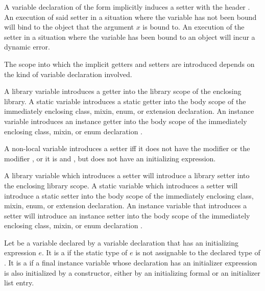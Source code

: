\documentclass[makeidx]{article}
\begin{document}
\LMHash{}%
A variable declaration of the form
implicitly induces a setter with the header
.
An execution of said setter
in a situation where the variable \id{} has not been bound
will bind \id{} to the object that the argument $x$ is bound to.
An execution of the setter
in a situation where the variable \id{} has been bound to an object
will incur a dynamic error.
\EndCase

\LMHash{}%
The scope into which the implicit getters and setters are introduced
depends on the kind of variable declaration involved.

\LMHash{}%
A library variable introduces a getter into
the library scope of the enclosing library.
A static variable introduces a static getter into
the body scope of the immediately enclosing
class, mixin, enum, or extension declaration.
An instance variable introduces an instance getter into
the body scope of the immediately enclosing
class, mixin, or enum declaration
.

\LMHash{}%
A non-local variable introduces a setter if{}f
it does not have the modifier \FINAL{} or the modifier \CONST{},
or it is \LATE{} and \FINAL, but does not have an initializing expression.

\LMHash{}%
A library variable which introduces a setter will introduce
a library setter into the enclosing library scope.
A static variable which introduces a setter will introduce
a static setter into the body scope of the immediately enclosing
class, mixin, enum, or extension declaration.
An instance variable that introduces a setter will introduce
an instance setter into the body scope of the immediately enclosing
class, mixin, or enum declaration
.

\LMHash{}%
Let \id{} be a variable declared by a variable declaration
that has an initializing expression $e$.
It is a  if the static type of $e$
is not assignable to the declared type of \id.
It is a  if a final instance variable
whose declaration has an initializer expression
is also initialized by a constructor,
either by an initializing formal or an initializer list entry.
\end{document}
